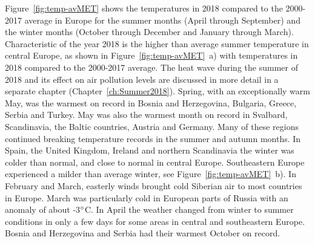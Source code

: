 Figure~\ref{fig:temp-avMET} shows the temperatures in 2018 compared to the 2000-2017 average in Europe for the summer months (April through September) and the winter months (October through December and January through March). 
Characteristic of the year 2018 is the higher than average summer temperature in central Europe, as shown in Figure~\ref{fig:temp-avMET}~a) with temperatures in 2018 compared to the 2000-2017 average. The heat wave during the summer of 2018 and its effect on air pollution levels are discussed in more detail in a separate chapter (Chapter~\ref{ch:Summer2018}). Spring, with an exceptionally warm May, was the warmest on record in Bosnia and Herzegovina, Bulgaria, Greece, Serbia and Turkey. May was also the warmest month on record in Svalbard, Scandinavia, the Baltic countries, Austria and Germany. Many of these regions continued breaking temperature records in the summer and autumn months.
In Spain, the United Kingdom, Ireland and northern Scandinavia the winter was colder than normal, and close to normal in central Europe. Southeastern Europe experienced a milder than average winter, see Figure~\ref{fig:temp-avMET}~b). In February and March, easterly winds brought cold Siberian air to most countries in Europe. March was particularly cold in European parts of Russia with an anomaly of about -3$^\circ$C. In April the weather changed from winter to summer conditions in only a few days for some areas in central and southeastern Europe. 
Bosnia and Herzegovina and Serbia had their warmest October on record.

